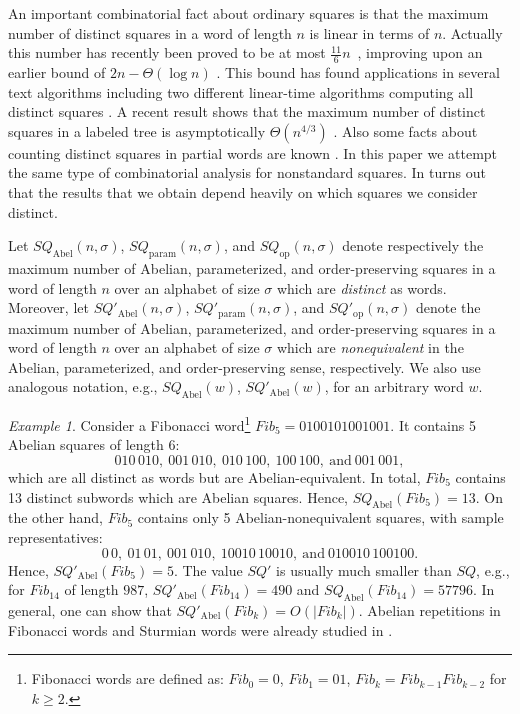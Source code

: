 \documentclass{article}
\theoremstyle{plain}
\theoremstyle{definition}
\theoremstyle{remark}
\newtheorem{example}[theorem]{Example}
\newcommand{\SQ}{\mathit{SQ}}
\newcommand{\Fib}{\mathit{Fib}}
\newcommand{\SQABEL}{\SQ_{\mathrm{Abel}}}
\newcommand{\SQPABEL}{\SQ'_{\mathrm{Abel}}}
\newcommand{\SQPARAM}{\SQ_{\mathrm{param}}}
\newcommand{\SQPPARAM}{\SQ'_{\mathrm{param}}}
\newcommand{\SQOP}{\SQ_{\mathrm{op}}}
\newcommand{\SQPOP}{\SQ'_{\mathrm{op}}}
\begin{document}
  An important combinatorial fact about ordinary squares is that the maximum number
  of distinct squares in a word of length $n$ is linear in terms of $n$.
  Actually this number has recently been proved to be at most $\frac{11}{6}n$~\cite{DBLP:journals/dam/DezaFT15},
  improving upon an earlier bound of $2n-\Theta(\log n)$
  \cite{fraenkel-simpson,DBLP:journals/jct/Ilie05,DBLP:journals/tcs/Ilie07}.
  This bound has found applications in several text algorithms
  \cite{DBLP:journals/tcs/CrochemoreIR09} including two different linear-time algorithms
  computing all distinct squares \cite{DBLP:journals/jcss/GusfieldS04,Extracting_TCS}.
  A recent result shows that the maximum number of distinct squares in a labeled tree is
  asymptotically $\Theta(n^{4/3})$ \cite{DBLP:conf/cpm/CrochemoreIKKRRTW12}.
  Also some facts about counting distinct squares in partial words are known
  \cite{DBLP:conf/dlt/Blanchet-SadriJM12,DBLP:journals/actaC/Blanchet-SadriMS09}.
  In this paper we attempt the same type of combinatorial analysis for nonstandard squares.
  In turns out that the results that we obtain depend heavily on which squares
  we consider distinct.

  Let $\SQABEL(n,\sigma)$, $\SQPARAM(n,\sigma)$, and $\SQOP(n,\sigma)$ denote respectively the maximum number of
  Abelian, parameterized, and order-preserving squares in a word of length $n$ over
  an alphabet of size $\sigma$ which are \emph{distinct} as words.
  Moreover, let $\SQPABEL(n,\sigma)$, $\SQPPARAM(n,\sigma)$, and $\SQPOP(n,\sigma)$ denote the maximum number of
  Abelian, parameterized, and order-preserving squares in a word of length $n$ over
  an alphabet of size $\sigma$ which are \emph{nonequivalent} in the Abelian, parameterized,  and order-preserving sense, respectively.
  We also use analogous notation, e.g., $\SQABEL(w)$, $\SQPABEL(w)$, for an arbitrary word $w$.

  \begin{example}
    Consider a Fibonacci word\footnote{Fibonacci words are defined as: $\Fib_0=0$, $\Fib_1=01$, $\Fib_k = \Fib_{k-1} \Fib_{k-2}$ for $k \ge 2$.
    }  $\Fib_5=0100101001001$.
    It contains 5 Abelian squares of length 6:
    \[010\,010,\ 001\,010,\ 010\,100,\ 100\,100,\ \mbox{and}\ 001\,001,\]
    which are all distinct as words but are Abelian-equivalent.
    In total, $\Fib_5$ contains 13 distinct subwords which are Abelian squares.
    Hence, $\SQABEL(\Fib_5)=13$.
    On the other hand, $\Fib_5$ contains only 5 Abelian-nonequivalent squares, with sample representatives:
    \[0\,0,\ 01\,01,\ 001\,010,\ 10010\,10010,\ \mbox{and}\ 010010\,100100.\]
    Hence, $\SQPABEL(\Fib_5)=5$.
    The value $\SQ'$ is usually much smaller than $\SQ$, e.g., for $\Fib_{14}$ of length $987$,
    $\SQPABEL(\Fib_{14})=490$ and
    $\SQABEL(\Fib_{14})=57796$.
    In general, one can show that $\SQPABEL(\Fib_k)=O(|\Fib_k|)$.
    Abelian repetitions in Fibonacci words and Sturmian words were already studied in \cite{DBLP:conf/dlt/FiciLLLMP13}.
  \end{example}
\end{document}
